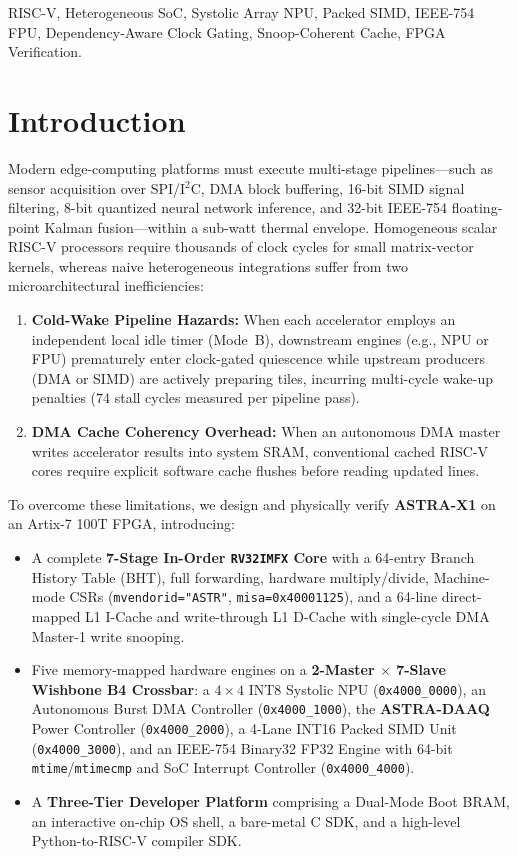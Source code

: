 \documentclass[conference]{IEEEtran}
\begin{document}
\begin{IEEEkeywords}
RISC-V, Heterogeneous SoC, Systolic Array NPU, Packed SIMD, IEEE-754 FPU, Dependency-Aware Clock Gating, Snoop-Coherent Cache, FPGA Verification.
\end{IEEEkeywords}

\section{Introduction}
Modern edge-computing platforms must execute multi-stage pipelines—such as sensor acquisition over SPI/I$^2$C, DMA block buffering, 16-bit SIMD signal filtering, 8-bit quantized neural network inference, and 32-bit IEEE-754 floating-point Kalman fusion—within a sub-watt thermal envelope. Homogeneous scalar RISC-V processors require thousands of clock cycles for small matrix-vector kernels, whereas naive heterogeneous integrations suffer from two microarchitectural inefficiencies:
\begin{enumerate}
    \item \textbf{Cold-Wake Pipeline Hazards:} When each accelerator employs an independent local idle timer (Mode~B), downstream engines (e.g., NPU or FPU) prematurely enter clock-gated quiescence while upstream producers (DMA or SIMD) are actively preparing tiles, incurring multi-cycle wake-up penalties ($74$ stall cycles measured per pipeline pass).
    \item \textbf{DMA Cache Coherency Overhead:} When an autonomous DMA master writes accelerator results into system SRAM, conventional cached RISC-V cores require explicit software cache flushes before reading updated lines.
\end{enumerate}

To overcome these limitations, we design and physically verify \textbf{ASTRA-X1} on an Artix-7 100T FPGA, introducing:
\begin{itemize}
    \item A complete \textbf{7-Stage In-Order \texttt{RV32IMFX} Core} with a 64-entry Branch History Table (BHT), full forwarding, hardware multiply/divide, Machine-mode CSRs (\texttt{mvendorid="ASTR"}, \texttt{misa=0x40001125}), and a 64-line direct-mapped L1 I-Cache and write-through L1 D-Cache with single-cycle DMA Master-1 write snooping.
    \item Five memory-mapped hardware engines on a \textbf{2-Master $\times$ 7-Slave Wishbone B4 Crossbar}: a $4 \times 4$ INT8 Systolic NPU (\texttt{0x4000\_0000}), an Autonomous Burst DMA Controller (\texttt{0x4000\_1000}), the \textbf{ASTRA-DAAQ} Power Controller (\texttt{0x4000\_2000}), a 4-Lane INT16 Packed SIMD Unit (\texttt{0x4000\_3000}), and an IEEE-754 Binary32 FP32 Engine with 64-bit \texttt{mtime}/\texttt{mtimecmp} and SoC Interrupt Controller (\texttt{0x4000\_4000}).
    \item A \textbf{Three-Tier Developer Platform} comprising a Dual-Mode Boot BRAM, an interactive on-chip OS shell, a bare-metal C SDK, and a high-level Python-to-RISC-V compiler SDK.
\end{itemize}
\end{document}
